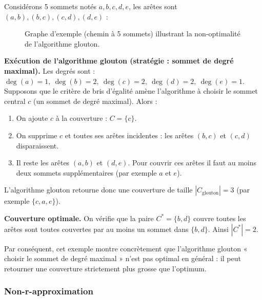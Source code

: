 \documentclass[11pt,a4paper]{article}
\begin{document}
Considérons 5 sommets notés \(a,b,c,d,e\), les arêtes sont \((a,b),(b,c),(c,d),(d,e)\) :
\begin{figure}[H]
    \centering
    \caption{Graphe d'exemple (chemin à 5 sommets) illustrant la non-optimalité de l'algorithme glouton.}
\end{figure}

\textbf{Exécution de l'algorithme glouton (stratégie : sommet de degré maximal).}  
Les degrés sont : $\deg(a)=1,\ \deg(b)=2,\ \deg(c)=2,\ \deg(d)=2,\ \deg(e)=1$.  
Supposons que le critère de bris d'égalité amène l'algorithme à choisir le sommet central \(c\) (un sommet de degré maximal). Alors :
\begin{enumerate}
  \item On ajoute \(c\) à la couverture : $C=\{c\}$.
  \item On supprime \(c\) et toutes ses arêtes incidentes : les arêtes $(b,c)$ et $(c,d)$ disparaissent.
  \item Il reste les arêtes $(a,b)$ et $(d,e)$. Pour couvrir ces arêtes il faut au moins deux sommets supplémentaires (par exemple \(a\) et \(e\)).
\end{enumerate}
L'algorithme glouton retourne donc une couverture de taille $|C_{\text{glouton}}|=3$ (par exemple $\{c,a,e\}$).

\medskip

\textbf{Couverture optimale.}  
On vérifie que la paire $C^{*}=\{b,d\}$ couvre toutes les arêtes sont toutes couvertes par au moins un sommet dans $\{b,d\}$. Ainsi $|C^{*}|=2$.

Par conséquent, cet exemple montre concrètement que l'algorithme glouton « choisir le sommet de degré maximal » n'est pas optimal en général : il peut retourner une couverture strictement plus grosse que l'optimum.

\subsubsection{Non-r-approximation}
\end{document}

